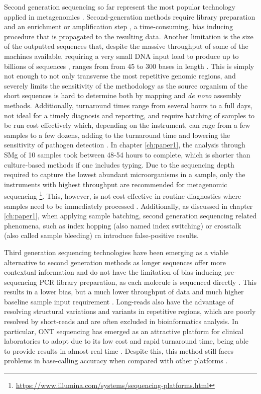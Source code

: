 Second generation sequencing so far represent the most popular technology applied in metagenomics \citep{rossen_practical_2018, loman_twenty_2015, loman_high-throughput_2012, schuele_future_2021}. Second-generation methods require library preparation and an enrichment or amplification step \citep{hagemann_overview_2015}, a time-consuming, bias inducing procedure that is propagated to the resulting data. Another limitation is the size of the outputted sequences that, despite the massive throughput of some of the machines available, requiring a very small \ac{DNA} input load to produce up to billions of sequences \citep{loman_twenty_2015}, ranges from from 45 to 300 bases in length \citep{loman_performance_2012, ari_next-generation_2016}. This is simply not enough to not only transverse the most repetitive genomic regions, and severely limits the sensitivity of the methodology as the source organism of the short sequences is hard to determine both by mapping and \textit{de novo} assembly methods. Additionally, turnaround times range from several hours to a full days, not ideal for a timely diagnosis and reporting, and require batching of samples to be run cost effectively which, depending on the instrument, can rage from a few samples to a few dozens, adding to the turnaround time and lowering the sensitivity of pathogen detection \citep{greninger_challenge_2018, schuele_future_2021}. In chapter \ref{ch:paper1}, the analysis through \ac{SMg} of 10 samples took between 48-54 hours to complete, which is shorter than culture-based methods if one includes typing. Due to the sequencing depth required to capture the lowest abundant microorganisms in a sample, only the instruments with highest throughput are recommended for metagenomic sequencing \footnote{ \url{https://www.illumina.com/systems/sequencing-platforms.html}}. This, however, is not cost-effective in routine diagnostics where samples need to be immediately processed \citep{rossen__2018}. Additionally, as discussed in chapter \ref{ch:paper1}, when applying sample batching, second generation sequencing related phenomena, such as index hopping (also named index switching) or crosstalk (also called sample bleeding) ca introduce false-positive results.

Third generation sequencing technologies have been emerging as a viable alternative to second generation methods as longer sequences offer more contextual information and do not have the limitation of bias-inducing pre-sequencing \ac{PCR} library preparation, as each molecule is sequenced directly \citep{loman_twenty_2015, ari_next-generation_2016}. This results in a lower bias, but a much lower throughput of data and much higher baseline sample input requirement \citep{gu_clinical_2019}. Long-reads also have the advantage of resolving structural variations and variants in repetitive regions, which are poorly resolved by short-reads and are often excluded in bioinformatics analysis. In particular, \ac{ONT} sequencing has emerged as an attractive platform for clinical laboratories to adopt due to its low cost and rapid turnaround time, being able to provide results in almost real time \citep{petersen_third-generation_2019}. Despite this, this method still faces problems in base-calling accuracy when compared with other platforms \citep{gu_clinical_2019}. 

